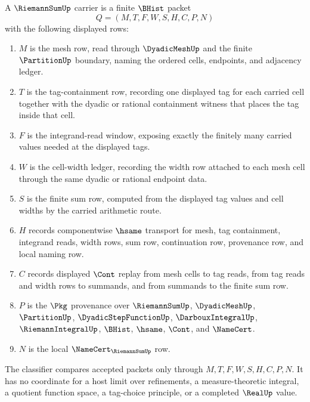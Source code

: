 \begin{definition}
\label{def:riemann-sum-carrier}
A $\RiemannSumUp$ carrier is a finite $\BHist$ packet
$$
Q=(M,T,F,W,S,H,C,P,N)
$$
with the following displayed rows:
\begin{enumerate}
\item $M$ is the mesh row, read through $\DyadicMeshUp$ and the finite $\PartitionUp$ boundary, naming the ordered cells, endpoints, and adjacency ledger.
\item $T$ is the tag-containment row, recording one displayed tag for each carried cell together with the dyadic or rational containment witness that places the tag inside that cell.
\item $F$ is the integrand-read window, exposing exactly the finitely many carried values needed at the displayed tags.
\item $W$ is the cell-width ledger, recording the width row attached to each mesh cell through the same dyadic or rational endpoint data.
\item $S$ is the finite sum row, computed from the displayed tag values and cell widths by the carried arithmetic route.
\item $H$ records componentwise $\hsame$ transport for mesh, tag containment, integrand reads, width rows, sum row, continuation row, provenance row, and local naming row.
\item $C$ records displayed $\Cont$ replay from mesh cells to tag reads, from tag reads and width rows to summands, and from summands to the finite sum row.
\item $P$ is the $\Pkg$ provenance over $\RiemannSumUp$, $\DyadicMeshUp$, $\PartitionUp$, $\DyadicStepFunctionUp$, $\DarbouxIntegralUp$, $\RiemannIntegralUp$, $\BHist$, $\hsame$, $\Cont$, and $\NameCert$.
\item $N$ is the local $\NameCert_{\RiemannSumUp}$ row.
\end{enumerate}
The classifier compares accepted packets only through $M,T,F,W,S,H,C,P,N$. It has no coordinate for a host limit over refinements, a measure-theoretic integral, a quotient function space, a tag-choice principle, or a completed $\RealUp$ value.
\end{definition}

